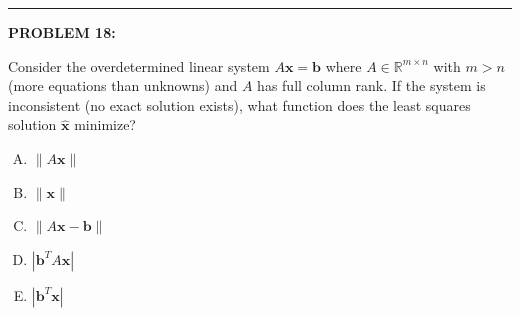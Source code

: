 \documentclass[12pt]{amsart}
\newcommand{\divider}{
  \vspace{-1em} %
  \noindent
  \raisebox{-0.15ex}{\textbullet}%
  \hspace{0.5em}%
  \rule[0.5ex]{0.95\textwidth}{1.0pt}%
  \hspace{0.5em}%
  \raisebox{-0.15ex}{\textbullet}%
  \vspace{0em} %
}
\begin{document}

\divider




{\bf PROBLEM 18:}

Consider the overdetermined linear system $A\mathbf{x} = \mathbf{b}$ where $A \in \mathbb{R}^{m \times n}$ with $m > n$ (more equations than unknowns) and $A$ has full column rank. If the system is inconsistent (no exact solution exists), what function does the least squares solution $\hat{\mathbf{x}}$ minimize?

\begin{enumerate}[(A)]
\item $\|A\mathbf{x}\|$
\item $\|\mathbf{x}\|$
\item $\|A\mathbf{x} - \mathbf{b}\|$
\item $|\mathbf{b}^T A \mathbf{x}|$
\item $|\mathbf{b}^T\mathbf{x}|$
\end{enumerate}
\end{document}

